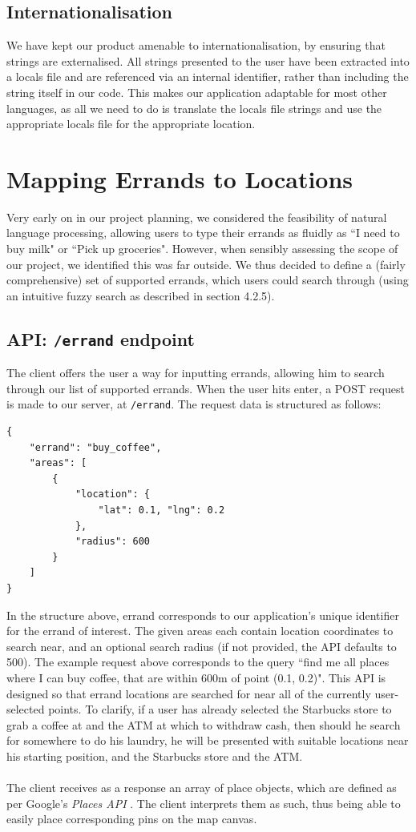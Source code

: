 \documentclass[a4paper, 10pt]{report}
\begin{document}
\subsection{Internationalisation}
We have kept our product amenable to internationalisation, by ensuring that strings are externalised. All strings presented to the user have been extracted into a locals file and are referenced via an internal identifier, rather than including the string itself in our code. This makes our application adaptable for most other languages, as all we need to do is translate the locals file strings and use the appropriate locals file for the appropriate location. \cite{i18n}
\section{Mapping Errands to Locations}
Very early on in our project planning, we considered the feasibility of natural language processing, allowing users to type their errands as fluidly as ``I need to buy milk" or ``Pick up groceries". However, when sensibly assessing the scope of our project, we identified this was far outside. We thus decided to define a (fairly comprehensive) set of supported errands, which users could search through (using an intuitive fuzzy search as described in section 4.2.5).
\subsection{API: \texttt{/errand} endpoint}
The client offers the user a way for inputting errands, allowing him to search through our list of supported errands. When the user hits enter, a POST request is made to our server, at \texttt{/errand}. The request data is structured as follows:
\begin{verbatim}
{
    "errand": "buy_coffee",
    "areas": [
        {
            "location": {
                "lat": 0.1, "lng": 0.2
            },
            "radius": 600
        }
    ]
}
\end{verbatim}
In the structure above, errand corresponds to our application's unique identifier for the errand of interest. The given areas each contain location coordinates to search near, and an optional search radius (if not provided, the API defaults to 500). The example request above corresponds to the query ``find me all places where I can buy coffee, that are within 600m of point (0.1, 0.2)". This API is designed so that errand locations are searched for near all of the currently user-selected points. To clarify, if a user has already selected the Starbucks store to grab a coffee at and the ATM at which to withdraw cash, then should he search for somewhere to do his laundry, he will be presented with suitable locations near his starting position, and the Starbucks store and the ATM.\\\\
The client receives as a response an array of place objects, which are defined as per Google's \textit{Places API} \cite{google-places}. The client interprets them as such, thus being able to easily place corresponding pins on the map canvas.
\end{document}
